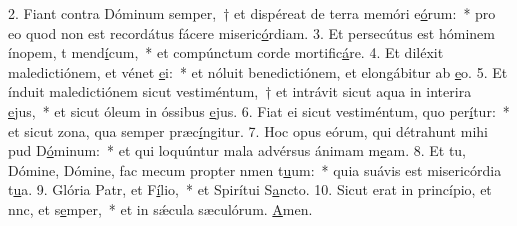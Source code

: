2. Fiant contra Dóminum semper,~† et dispéreat de terra memóri e\uline{ó}rum:~* pro eo quod non est recordátus fácere miseric\uline{ó}rdiam.
3. Et persecútus est hóminem ínopem, t mend\uline{í}cum,~* et compúnctum corde mortific\uline{á}re.
4. Et diléxit maledictiónem, et vénet \uline{e}i:~* et nóluit benedictiónem, et elongábitur ab \uline{e}o.
5. Et índuit maledictiónem sicut vestiméntum,~† et intrávit sicut aqua in interira \uline{e}jus,~* et sicut óleum in óssibus \uline{e}jus.
6. Fiat ei sicut vestiméntum, quo per\uline{í}tur:~* et sicut zona, qua semper præc\uline{í}ngitur.
7. Hoc opus eórum, qui détrahunt mihi pud D\uline{ó}minum:~* et qui loquúntur mala advérsus ánimam m\uline{e}am.
8. Et tu, Dómine, Dómine, fac mecum propter nmen t\uline{u}um:~* quia suávis est misericórdia t\uline{u}a.
9. Glória Patr, et F\uline{í}lio,~* et Spirítui S\uline{a}ncto.
10. Sicut erat in princípio, et nnc, et s\uline{e}mper,~* et in sǽcula sæculórum. \uline{A}men.
